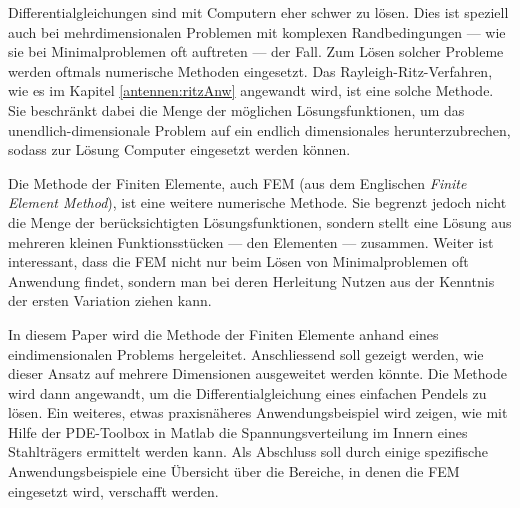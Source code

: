 %
%
%
%



Differentialgleichungen sind mit Computern eher schwer zu lösen. 
Dies ist speziell auch bei mehrdimensionalen Problemen mit komplexen Randbedingungen --- wie sie bei Minimalproblemen oft auftreten --- der Fall. 
Zum Lösen solcher Probleme werden oftmals numerische Methoden eingesetzt. 
Das Rayleigh-Ritz-Verfahren, wie es im Kapitel \ref{antennen:ritzAnw} angewandt wird, ist eine solche Methode.
Sie beschränkt dabei die Menge der möglichen Lösungsfunktionen, um das unendlich-dimensionale Problem auf ein endlich dimensionales herunterzubrechen, sodass zur Lösung Computer eingesetzt werden können. 

Die Methode der Finiten Elemente, auch FEM (aus dem Englischen {\em Finite Element Method}), ist eine weitere numerische Methode.
Sie begrenzt jedoch nicht die Menge der berücksichtigten Lösungsfunktionen, sondern stellt eine Lösung aus mehreren kleinen Funktionsstücken --- den Elementen --- zusammen.
Weiter ist interessant, dass die FEM nicht nur beim Lösen von Minimalproblemen oft Anwendung findet, sondern man bei deren Herleitung Nutzen aus der Kenntnis der ersten Variation ziehen kann. 

In diesem Paper wird die Methode der Finiten Elemente anhand eines eindimensionalen Problems hergeleitet. 
Anschliessend soll gezeigt werden, wie dieser Ansatz auf mehrere Dimensionen ausgeweitet werden könnte. 
Die Methode wird dann angewandt, um die Differentialgleichung eines einfachen Pendels zu lösen. 
Ein weiteres, etwas praxisnäheres Anwendungsbeispiel wird zeigen, wie mit Hilfe der PDE-Toolbox in Matlab die Spannungsverteilung im Innern eines Stahlträgers ermittelt werden kann. %
Als Abschluss soll durch einige spezifische Anwendungsbeispiele eine Übersicht über die Bereiche, in denen die FEM eingesetzt wird, verschafft werden.
